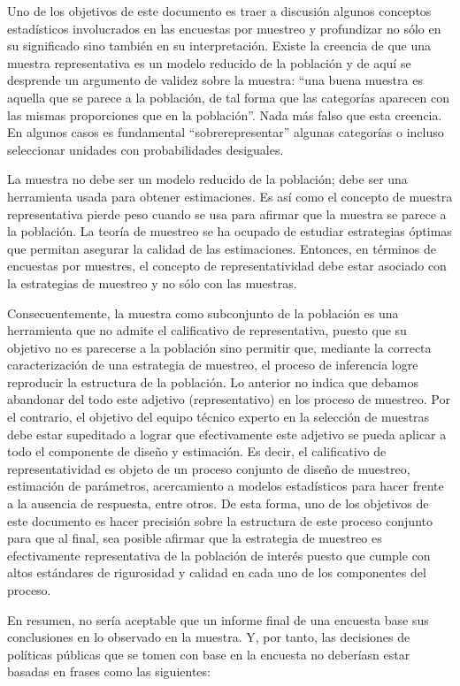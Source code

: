 \documentclass[
  12pt,
  spanish,
]{book}
\begin{document}
Uno de los objetivos de este documento es traer a discusión algunos conceptos estadísticos involucrados en las encuestas por muestreo y profundizar no sólo en su significado sino también en su interpretación. Existe la creencia de que una muestra representativa es un modelo reducido de la población y de aquí se desprende un argumento de validez sobre la muestra: ``una buena muestra es aquella que se parece a la población, de tal forma que las categorías aparecen con las mismas proporciones que en la población''. Nada más falso que esta creencia. En algunos casos es fundamental ``sobrerepresentar'' algunas categorías o incluso seleccionar unidades con probabilidades desiguales.

La muestra no debe ser un modelo reducido de la población; debe ser una herramienta usada para obtener estimaciones. Es así como el concepto de muestra representativa pierde peso cuando se usa para afirmar que la muestra se parece a la población. La teoría de muestreo se ha ocupado de estudiar estrategias óptimas que permitan asegurar la calidad de las estimaciones. Entonces, en términos de encuestas por muestres, el concepto de representatividad debe estar asociado con la estrategias de muestreo y no sólo con las muestras.

Consecuentemente, la muestra como subconjunto de la población es una herramienta que no admite el calificativo de representativa, puesto que su objetivo no es parecerse a la población sino permitir que, mediante la correcta caracterización de una estrategia de muestreo, el proceso de inferencia logre reproducir la estructura de la población.
Lo anterior no indica que debamos abandonar del todo este adjetivo (representativo) en los proceso de muestreo. Por el contrario, el objetivo del equipo técnico experto en la selección de muestras debe estar supeditado a lograr que efectivamente este adjetivo se pueda aplicar a todo el componente de diseño y estimación. Es decir, el calificativo de representatividad es objeto de un proceso conjunto de diseño de muestreo, estimación de parámetros, acercamiento a modelos estadísticos para hacer frente a la ausencia de respuesta, entre otros. De esta forma, uno de los objetivos de este documento es hacer precisión sobre la estructura de este proceso conjunto para que al final, sea posible afirmar que la estrategia de muestreo es efectivamente representativa de la población de interés puesto que cumple con altos estándares de rigurosidad y calidad en cada uno de los componentes del proceso.

En resumen, no sería aceptable que un informe final de una encuesta base sus conclusiones en lo observado en la muestra. Y, por tanto, las decisiones de políticas públicas que se tomen con base en la encuesta no deberíasn estar basadas en frases como las siguientes:
\end{document}
